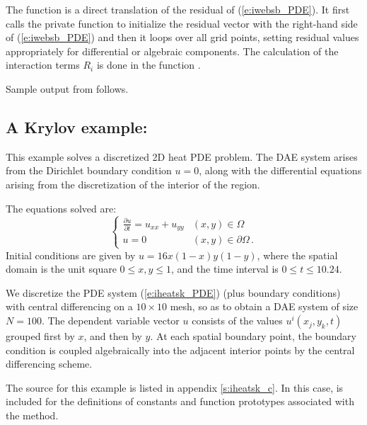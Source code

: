 The function  is a direct translation of the residual of (\ref{e:iwebsb_PDE}).
It first calls the private function  to initialize the residual vector
with the right-hand side of (\ref{e:iwebsb_PDE}) and then
it loops over all grid points, setting residual values appropriately for 
differential or algebraic components. The calculation of the interaction terms
$R_i$ is done in the function .


Sample output from  follows.


\subsection{A Krylov example: }\label{ss:iheatsk}

This example solves a discretized 2D heat PDE problem. The DAE system
arises from the Dirichlet boundary condition $u = 0$, along with the 
differential equations arising from the discretization of the interior 
of the region. 

The equations solved are:
\begin{equation}\label{e:iheatsk_PDE}
\begin{cases}
  \frac{\partial u}{\partial t}  = u_{xx} + u_{yy}  & (x,y) \in \Omega \\
  u = 0 & (x,y) \in \partial\Omega\, .
\end{cases}
\end{equation}
Initial conditions are given by $u = 16x(1-x)y(1-y)$, where the spatial domain
is the unit square $0 \leq x,y \leq 1$, and the time interval is 
$0 \leq t \leq 10.24$.

We discretize the PDE system (\ref{e:iheatsk_PDE}) (plus boundary conditions)
with central differencing on a $10 \times 10$ mesh, so as to obtain a
DAE system of size $N = 100$.  The dependent variable vector $u$
consists of the values $u^i(x_j,y_k,t)$ grouped first by $x$, and then
by $y$.  At each spatial boundary point, the boundary condition is coupled
algebraically into the adjacent interior points by the central differencing
scheme. 

The source for this example is listed in appendix \ref{s:iheatsk_c}.
In this case,  is included for the definitions of
constants and function prototypes associated with the {\spgmr} method.

